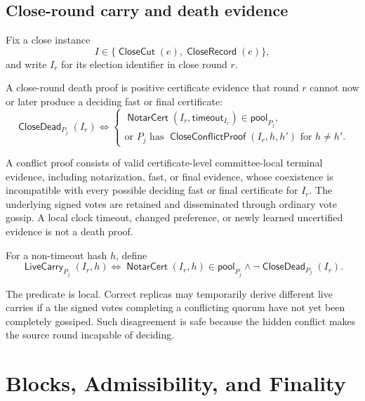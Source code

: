 \documentclass[sigplan,twocolumn,review,anonymous]{acmart}
\newcommand{\func}[1]{\operatorname{\mathsf{#1}}}
\newcommand{\NotarCert}{\func{NotarCert}}
\newcommand{\CloseCut}{\func{CloseCut}}
\newcommand{\CloseRecord}{\func{CloseRecord}}
\newcommand{\CloseDead}{\func{CloseDead}}
\newcommand{\LiveCarry}{\func{LiveCarry}}
\newcommand{\CloseConflictProof}{\func{CloseConflictProof}}
\newcommand{\timeoutVal}{\mathsf{timeout}}
\begin{document}
\subsection{Close-round carry and death evidence}

Fix a close instance
\[
I\in\{\CloseCut(e),\CloseRecord(e)\},
\]
and write \(I_r\) for its election identifier in close round \(r\).

A close-round death proof is positive certificate evidence that round \(r\) cannot now or later
produce a deciding fast or final certificate:
\[
\CloseDead_{P_j}(I_r)\iff
\begin{cases}
\NotarCert(I_r,\timeoutVal_{I_r})\in\mathsf{pool}_{P_j},\\
\text{or }P_j\text{ has }\CloseConflictProof(I_r,h,h')\text{ for }h\neq h'.
\end{cases}
\]

A conflict proof consists of valid certificate-level committee-local terminal evidence, including
notarization, fast, or final evidence, whose coexistence is incompatible with every possible deciding
fast or final certificate for \(I_r\).  The underlying signed votes are retained and disseminated through ordinary vote gossip.  A local clock timeout, changed preference, or newly learned
uncertified evidence is not a death proof.

For a non-timeout hash \(h\), define
\[
\LiveCarry_{P_j}(I_r,h)\iff
\NotarCert(I_r,h)\in\mathsf{pool}_{P_j}
\wedge
\neg\CloseDead_{P_j}(I_r).
\]

The predicate is local.  Correct replicas may temporarily derive different live carries if a
the signed votes completing a conflicting quorum have not yet been completely gossiped.  Such disagreement is safe because the
hidden conflict makes the source round incapable of deciding.

\section{Blocks, Admissibility, and Finality}
\end{document}
